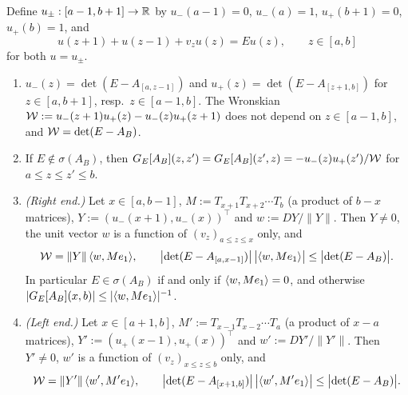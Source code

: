 \begin{lemma}\label{lem:green}
Define $u_\pm:[a-1,b+1]\to\mathbb{R}$ by $u_-(a-1)=0$, $u_-(a)=1$, $u_+(b+1)=0$, $u_+(b)=1$, and
\begin{equation}\label{eq:rec}
  u(z+1)+u(z-1)+v_zu(z)=Eu(z),\qquad z\in[a,b]
\end{equation}
for both $u=u_\pm$.
\begin{enumerate}[label=(\alph*)]
\item $u_-(z)=\det(E-A_{[a,z-1]})$ and $u_+(z)=\det(E-A_{[z+1,b]})$ for $z\in[a,b+1]$, resp.\
$z\in[a-1,b]$.  The Wronskian $\mathcal{W}:=u_-(z+1)u_+(z)-u_-(z)u_+(z+1)$ does not depend on $z\in[a-1,b]$,
and $\mathcal{W}=\det(E-A_B)$.
\item If $E\notin\sigma(A_B)$, then $G_E[A_B](z,z')=G_E[A_B](z',z)=-u_-(z)u_+(z')/\mathcal{W}$ for $a\le z\le z'\le b$.
\item \emph{(Right end.)} Let $x\in[a,b-1]$, $M:=T_{x+1}T_{x+2}\cdots T_b$ (a product of $b-x$ matrices),
$Y:=(u_-(x+1),u_-(x))^\top$ and $w:=DY/\|Y\|$.  Then $Y\ne0$, the unit vector $w$ is a function of
$(v_z)_{a\le z\le x}$ only, and
\begin{equation}\label{eq:greenR}
  \mathcal{W}=\|Y\|\,\langle w,Me_1\rangle,\qquad
  \bigl|\det(E-A_{[a,x-1]})\bigr|\,\bigl|\langle w,Me_1\rangle\bigr|\le\bigl|\det(E-A_B)\bigr| .
\end{equation}
In particular $E\in\sigma(A_B)$ if and only if $\langle w,Me_1\rangle=0$, and otherwise
$|G_E[A_B](x,b)|\le|\langle w,Me_1\rangle|^{-1}$.
\item \emph{(Left end.)} Let $x\in[a+1,b]$, $M':=T_{x-1}T_{x-2}\cdots T_a$ (a product of $x-a$ matrices),
$Y':=(u_+(x-1),u_+(x))^\top$ and $w':=DY'/\|Y'\|$.  Then $Y'\neq0$, $w'$ is a function of $(v_z)_{x\le z\le b}$
only, and
\begin{equation}\label{eq:greenL}
  \mathcal{W}=\|Y'\|\,\langle w',M'e_1\rangle,\qquad
  \bigl|\det(E-A_{[x+1,b]})\bigr|\,\bigl|\langle w',M'e_1\rangle\bigr|\le\bigl|\det(E-A_B)\bigr| .
\end{equation}
\end{enumerate}
\end{lemma}

